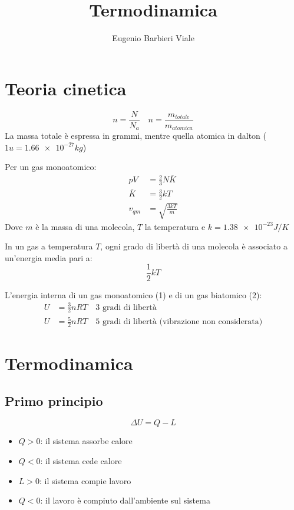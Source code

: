 \documentclass{article}
\title{Termodinamica}
\author{Eugenio Barbieri Viale}
\begin{document}
\setlength{\parindent}{0pt}
\maketitle

\section*{Teoria cinetica}
$$ n = \frac{N}{N_a} \hspace{1em} n = \frac{m_{totale}}{m_{atomica}} $$
La massa totale è espressa in grammi, mentre quella atomica in dalton ($1u = \num{1.66e-27} kg$)

\vspace{1em}

Per un gas monoatomico:
\begin{align*}
    pV &= \frac{2}{3}N\overline{K} \\
    \overline{K} &= \frac{3}{2}kT \\
    v_{qm} &= \sqrt{\frac{3kT}{m}}
\end{align*}
Dove $m$ è la massa di una molecola, $T$ la temperatura e $k = \num{1.38e-23} J/K$

\vspace{1em}

In un gas a temperatura $T$, ogni grado di libertà di una molecola è associato a un'energia media pari a:
$$ \frac{1}{2}kT $$

\vspace{1em}

L'energia interna di un gas monoatomico (1) e di un gas biatomico (2):
\begin{align}
    U &= \frac{3}{2}nRT \hspace{1em} \text{3 gradi di libertà}\\
    U &= \frac{5}{2}nRT \hspace{1em} \text{5 gradi di libertà (vibrazione non considerata)}
\end{align}

\section*{Termodinamica}

\subsection*{Primo principio}
$$ \Delta U = Q - L $$
\begin{itemize}
    \item $Q > 0$: il sistema assorbe calore
    \item $Q < 0$: il sistema cede calore
    \item $L > 0$: il sistema compie lavoro 
    \item $Q < 0$: il lavoro è compiuto dall'ambiente sul sistema
\end{itemize}
\end{document}
